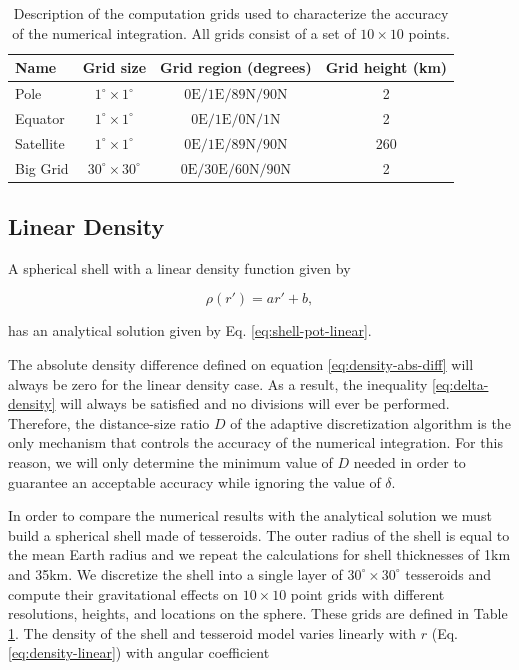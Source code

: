 \documentclass[extra, referee]{gji}
\begin{document}
\begin{table}
\caption{
    Description of the computation grids used to characterize the accuracy of the
    numerical integration.
    All grids consist of a set of $10 \times 10$ points.
}
\label{tab:grids}
\begin{tabular}{lccc}
    Name & Grid size & Grid region (degrees) & Grid height (km)
    \\ \hline
    Pole & $1^\circ \times 1^\circ$ & $0\text{E}/1\text{E}/89\text{N}/90\text{N}$ & 2 \\
    Equator & $1^\circ \times 1^\circ$ & $0\text{E}/1\text{E}/0\text{N}/1\text{N}$ & 2 \\
    Satellite & $1^\circ \times 1^\circ$ & $0\text{E}/1\text{E}/89\text{N}/90\text{N}$ & 260 \\
    Big Grid & $30^\circ \times 30^\circ$ & $0\text{E}/30\text{E}/60\text{N}/90\text{N}$ & 2 \\
\end{tabular}
\end{table}


\subsection{Linear Density}

A spherical shell with a linear density function given by

\begin{equation}
    \rho(r') = ar' + b,
    \label{eq:density-linear}
\end{equation}

\noindent
has an analytical solution given by Eq. \ref{eq:shell-pot-linear}.

The absolute density difference defined on equation
\ref{eq:density-abs-diff} will always be zero for the linear density case.
As a result, the inequality \ref{eq:delta-density} will always be satisfied and no
divisions will ever be performed.
Therefore, the distance-size ratio $D$ of the adaptive discretization algorithm is the
only mechanism that controls the accuracy of the numerical integration.
For this reason, we will only determine the minimum value of $D$ needed in order to
guarantee an acceptable accuracy while ignoring the value of $\delta$.

In order to compare the numerical results with the analytical solution we
must build a spherical shell made of tesseroids.
The outer radius of the shell is equal to the mean Earth radius and we repeat the
calculations for shell thicknesses of 1km and 35km.
We discretize the shell into a single layer of $30^\circ \times 30^\circ$ tesseroids and
compute their gravitational effects on $10 \times 10$ point grids with different
resolutions, heights, and locations on the sphere.
These grids are defined in Table \ref{tab:grids}.
The density of the shell and tesseroid model varies linearly with $r$
(Eq. \ref{eq:density-linear}) with angular coefficient
\end{document}
